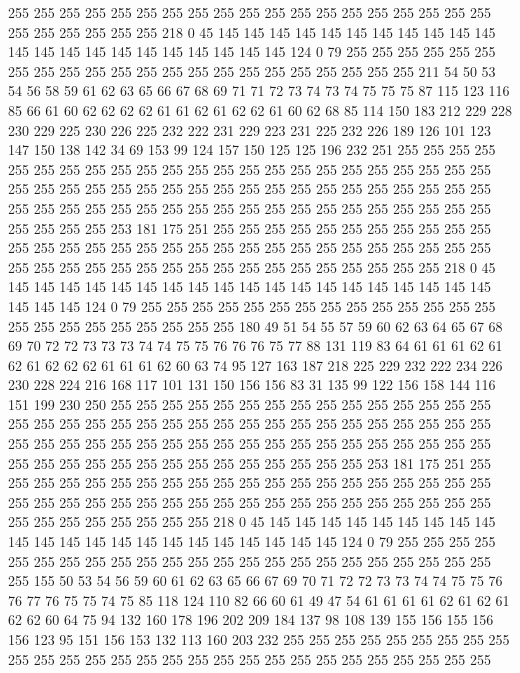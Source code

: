 255 255 255 255 255 255 255 255 255 255 255 255 255 255 255 255 255 255 255 255
255 255 255 255 255 218 0 45 145 145 145 145 145 145 145 145 145 145 145 145
145 145 145 145 145 145 145 145 145 145 124 0 79 255 255 255 255 255 255 255
255 255 255 255 255 255 255 255 255 255 255 255 255 255 255 211 54 50 53 54
56 58 59 61 62 63 65 66 67 68 69 71 71 72 73 74 73 74 75 75
75 87 115 123 116 85 66 61 60 62 62 62 62 61 61 62 61 62 62 61
60 62 68 85 114 150 183 212 229 228 230 229 225 230 226 225 232 222 231 229
223 231 225 232 226 189 126 101 123 147 150 138 142 34 69 153 99 124 157 150
125 125 196 232 251 255 255 255 255 255 255 255 255 255 255 255 255 255 255 255
255 255 255 255 255 255 255 255 255 255 255 255 255 255 255 255 255 255 255 255
255 255 255 255 255 255 255 255 255 255 255 255 255 255 255 255 255 255 255 255
255 255 255 255 255 255 255 255 255 255 253 181 175 251 255 255 255 255 255 255
255 255 255 255 255 255 255 255 255 255 255 255 255 255 255 255 255 255 255 255
255 255 255 255 255 255 255 255 255 255 255 255 255 255 255 255 255 255 255 255
255 218 0 45 145 145 145 145 145 145 145 145 145 145 145 145 145 145 145 145
145 145 145 145 145 145 124 0 79 255 255 255 255 255 255 255 255 255 255 255
255 255 255 255 255 255 255 255 255 255 255 255 180 49 51 54 55 57 59 60
62 63 64 65 67 68 69 70 72 72 73 73 73 74 74 75 75 76 76 76
75 77 88 131 119 83 64 61 61 61 62 61 62 61 62 62 62 61 61 61
62 60 63 74 95 127 163 187 218 225 229 232 222 234 226 230 228 224 216 168
117 101 131 150 156 156 83 31 135 99 122 156 158 144 116 151 199 230 250 255
255 255 255 255 255 255 255 255 255 255 255 255 255 255 255 255 255 255 255 255
255 255 255 255 255 255 255 255 255 255 255 255 255 255 255 255 255 255 255 255
255 255 255 255 255 255 255 255 255 255 255 255 255 255 255 255 255 255 255 255
255 255 255 255 255 255 253 181 175 251 255 255 255 255 255 255 255 255 255 255
255 255 255 255 255 255 255 255 255 255 255 255 255 255 255 255 255 255 255 255
255 255 255 255 255 255 255 255 255 255 255 255 255 255 255 255 255 218 0 45
145 145 145 145 145 145 145 145 145 145 145 145 145 145 145 145 145 145 145 145
145 145 124 0 79 255 255 255 255 255 255 255 255 255 255 255 255 255 255 255
255 255 255 255 255 255 255 255 255 155 50 53 54 56 59 60 61 62 63 65
66 67 69 70 71 72 72 73 73 74 74 75 75 76 76 77 76 75 75 74
75 85 118 124 110 82 66 60 61 49 47 54 61 61 61 61 62 61 62 61
62 62 60 64 75 94 132 160 178 196 202 209 184 137 98 108 139 155 156 155
156 156 123 95 151 156 153 132 113 160 203 232 255 255 255 255 255 255 255 255
255 255 255 255 255 255 255 255 255 255 255 255 255 255 255 255 255 255 255 255
